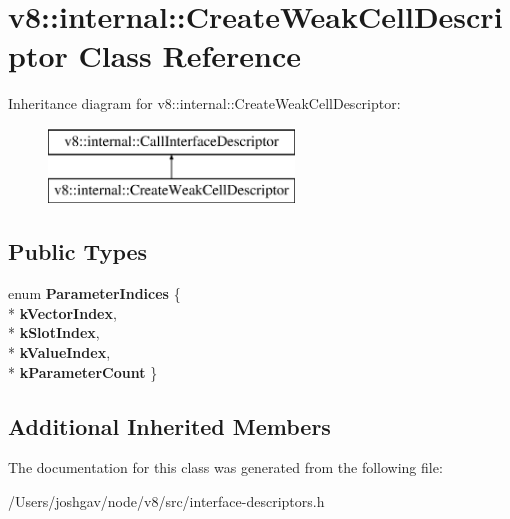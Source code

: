 \hypertarget{classv8_1_1internal_1_1_create_weak_cell_descriptor}{}\section{v8\+:\+:internal\+:\+:Create\+Weak\+Cell\+Descriptor Class Reference}
\label{classv8_1_1internal_1_1_create_weak_cell_descriptor}
Inheritance diagram for v8\+:\+:internal\+:\+:Create\+Weak\+Cell\+Descriptor\+:\begin{figure}[H]
\begin{center}
\leavevmode
\includegraphics[height=2.000000cm]{classv8_1_1internal_1_1_create_weak_cell_descriptor}
\end{center}
\end{figure}
\subsection*{Public Types}
\begin{DoxyCompactItemize}
\item 
enum {\bfseries Parameter\+Indices} \{ \\*
{\bfseries k\+Vector\+Index}, 
\\*
{\bfseries k\+Slot\+Index}, 
\\*
{\bfseries k\+Value\+Index}, 
\\*
{\bfseries k\+Parameter\+Count}
 \}\hypertarget{classv8_1_1internal_1_1_create_weak_cell_descriptor_ac4bc5809e22143f6ddd786e5a1def516}{}\label{classv8_1_1internal_1_1_create_weak_cell_descriptor_ac4bc5809e22143f6ddd786e5a1def516}

\end{DoxyCompactItemize}
\subsection*{Additional Inherited Members}


The documentation for this class was generated from the following file\+:\begin{DoxyCompactItemize}
\item 
/\+Users/joshgav/node/v8/src/interface-\/descriptors.\+h\end{DoxyCompactItemize}
